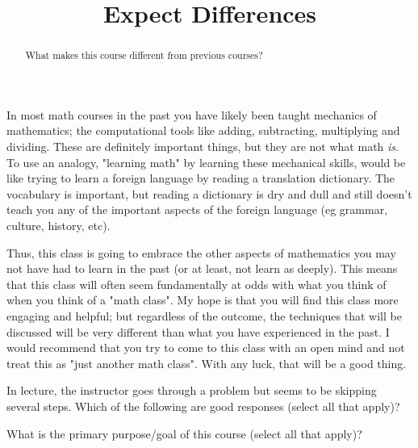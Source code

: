 \documentclass{ximeraXloud}
\title{Expect Differences}
\begin{document}
\begin{abstract}
What makes this course different from previous courses?
\end{abstract}
\maketitle


In most math courses in the past you have likely been taught mechanics of mathematics; the computational tools like adding, subtracting, multiplying and dividing. These are definitely important things, but they are not what math \textit{is}. To use an analogy, "learning math" by learning these mechanical skills, would be like trying to learn a foreign language by reading a translation dictionary. The vocabulary is important, but reading a dictionary is dry and dull and still doesn't teach you any of the important aspects of the foreign language (eg grammar, culture, history, etc).

Thus, this class is going to embrace the other aspects of mathematics you may not have had to learn in the past (or at least, not learn as deeply). This means that this class will often seem fundamentally at odds with what you think of when you think of a "math class". My hope is that you will find this class more engaging and helpful; but regardless of the outcome, the techniques that will be discussed will be very different than what you have experienced in the past. I would recommend that you try to come to this class with an open mind and not treat this as "just another math class". With any luck, that will be a good thing.


\begin{question}
    In lecture, the instructor goes through a problem but seems to be skipping several steps. Which of the following are good responses (select all that apply)?
    \begin{selectAll}
    \end{selectAll}
\end{question}

\begin{question}
    What is the primary purpose/goal of this course (select all that apply)?
    \begin{selectAll}
    \end{selectAll}
\end{question}
\end{document}
